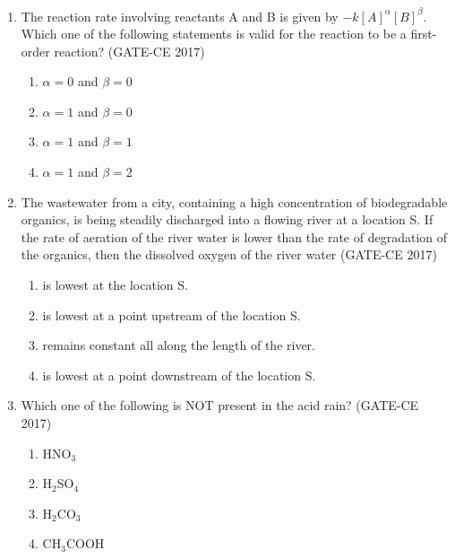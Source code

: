 \documentclass[journal,12pt,onecolumn]{article}
\theoremstyle{remark}
\begin{document}
\begin{enumerate}
    \item The reaction rate involving reactants A and B is given by $-k[A]^{\alpha}[B]^{\beta}$. Which one of the following statements is valid for the reaction to be a first-order reaction? \hfill (GATE-CE 2017)
    \begin{multicols}{2}
    \begin{enumerate}
        \item $\alpha = 0$ and $\beta = 0$
        \item $\alpha = 1$ and $\beta = 0$
        \item $\alpha = 1$ and $\beta = 1$
        \item $\alpha = 1$ and $\beta = 2$
    \end{enumerate}
    \end{multicols}

    \item The wastewater from a city, containing a high concentration of biodegradable organics, is being steadily discharged into a flowing river at a location S. If the rate of aeration of the river water is lower than the rate of degradation of the organics, then the dissolved oxygen of the river water \hfill (GATE-CE 2017)
    \begin{enumerate}
        \item is lowest at the location S.
        \item is lowest at a point upstream of the location S.
        \item remains constant all along the length of the river.
        \item is lowest at a point downstream of the location S.
    \end{enumerate}

    \item Which one of the following is NOT present in the acid rain? \hfill (GATE-CE 2017)
    \begin{multicols}{4}
    \begin{enumerate}
        \item HNO$_3$
        \item H$_2$SO$_4$
        \item H$_2$CO$_3$
        \item CH$_3$COOH
    \end{enumerate}
    \end{multicols}


\end{enumerate}
\end{document}
